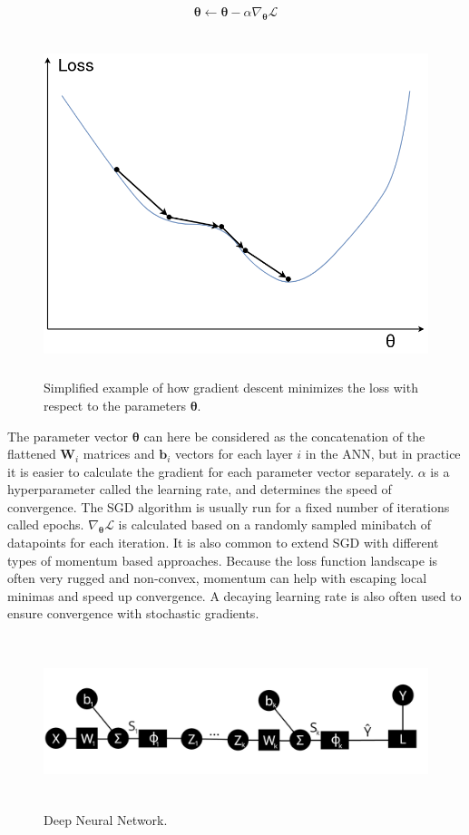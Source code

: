 \documentclass[12pt,a4paper]{book}
\begin{document}
\begin{equation}
    \bm{\theta} \leftarrow \bm{\theta} - \alpha \nabla_{\bm{\theta}} \mathcal{L}
    \label{eq:sgd}
\end{equation}

\begin{figure}[H]
    \centering
    \includegraphics[height=10cm]{figs/gradientdescent.png}
    \caption{Simplified example of how gradient descent minimizes the loss with respect to the parameters $\bm{\theta}$.}
    \label{fig:gradientdescent}
\end{figure}

The parameter vector $\bm{\theta}$ can here be considered as the concatenation of the flattened $\bm{W}_i$ matrices and $\bm{b}_i$ vectors for each layer $i$ in the ANN, but in practice it is easier to calculate the gradient for each parameter vector separately. $\alpha$ is a hyperparameter called the learning rate, and determines the speed of convergence. The SGD algorithm is usually run for a fixed number of iterations called epochs. $\nabla_{\bm{\theta}} \mathcal{L}$ is calculated based on a randomly sampled minibatch of datapoints for each iteration. It is also common to extend SGD with different types of momentum based approaches. Because the loss function landscape is often very rugged and non-convex, momentum can help with escaping local minimas and speed up convergence. A decaying learning rate is also often used to ensure convergence with stochastic gradients.

\begin{figure}[H]
    \centering
    \includegraphics[height=5cm]{figs/deepnetwork.png}
    \caption{Deep Neural Network.}
    \label{fig:deepnetwork}
\end{figure}
\end{document}
